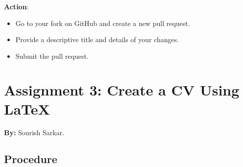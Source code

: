 \documentclass[a4paper,12pt]{article}
\begin{document}
\textbf{Action}:
\begin{itemize}
    \item Go to your fork on GitHub and create a new pull request.
    \item Provide a descriptive title and details of your changes.
    \item Submit the pull request.
\end{itemize}

\newpage
\section{Assignment 3: Create a CV Using LaTeX}

\textbf{By:} Sourish Sarkar.

\subsection*{Procedure}
\end{document}
